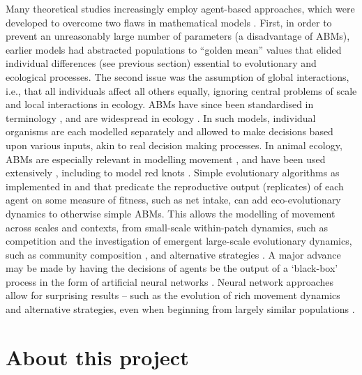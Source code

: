 Many theoretical studies increasingly employ agent-based approaches,
which were developed to overcome two flaws in mathematical models
\citep{huston1988}. First, in order to prevent an unreasonably large
number of parameters (a disadvantage of ABMs), earlier models had
abstracted populations to ``golden mean'' values that elided individual
differences (see previous section) essential to evolutionary and
ecological processes. The second issue was the assumption of global
interactions, i.e., that all individuals affect all others equally,
ignoring central problems of scale \citep{levin1992} and local
interactions \citep[see][]{legendre1993} in ecology. ABMs have since
been standardised in terminology \citep{grimm2006, grimm2010}, and are
widespread in ecology \citep{deangelis2018}. In such models, individual
organisms are each modelled separately and allowed to make decisions
based upon various inputs, akin to real decision making processes. In
animal ecology, ABMs are especially relevant in modelling movement
\citep[reviewed in][]{deangelis2005}, and have been used extensively
\citep{spiegel2017, spiegel2013, getz2015, getz2016}, including to model
red knots \citep{vangils2010}. Simple evolutionary algorithms
\citep[see][]{back1996} as implemented in \citet{getz2015} and
\citet{netz2017} that predicate the reproductive output (replicates) of
each agent on some measure of fitness, such as net intake, can add
eco-evolutionary dynamics to otherwise simple ABMs. This allows the
modelling of movement across scales and contexts, from small-scale
within-patch dynamics, such as competition \citep[see][ for a
primer]{keddy2001} and the investigation of emergent large-scale
evolutionary dynamics, such as community composition
\citep[\emph{movement guilds};][]{getz2015}, and alternative strategies
\citep{netz2017}. A major advance may be made by having the decisions of
agents be the output of a `black-box' process in the form of artificial
neural networks \citep[ANNs; see][ for example
implementation]{enquist2013, netz2017}. Neural network approaches allow
for surprising results -- such as the evolution of rich movement
dynamics and alternative strategies, even when beginning from largely
similar populations \citep{netz2017}.

\part{About this project}

